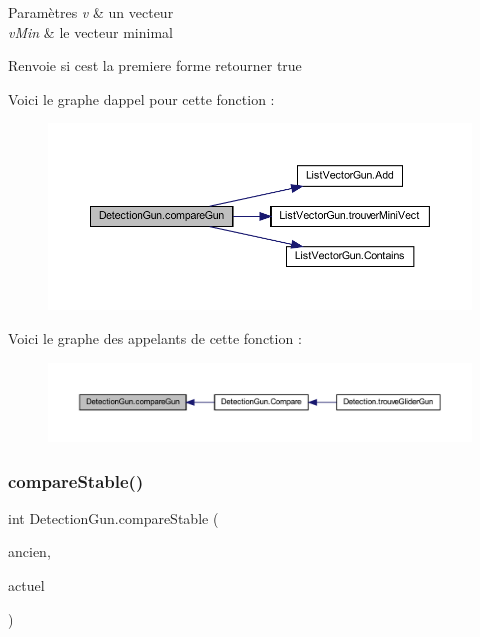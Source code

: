 \begin{DoxyParams}{Paramètres}
{\em v} & un vecteur \\
\hline
{\em v\+Min} & le vecteur minimal \\
\hline
\end{DoxyParams}
\begin{DoxyReturn}{Renvoie}
si c\textquotesingle{}est la premiere forme retourner true 
\end{DoxyReturn}
Voici le graphe d\textquotesingle{}appel pour cette fonction \+:\nopagebreak
\begin{figure}[H]
\begin{center}
\leavevmode
\includegraphics[width=350pt]{class_detection_gun_a0ca849e6a37b8734261999c4f8f64523_cgraph}
\end{center}
\end{figure}
Voici le graphe des appelants de cette fonction \+:\nopagebreak
\begin{figure}[H]
\begin{center}
\leavevmode
\includegraphics[width=350pt]{class_detection_gun_a0ca849e6a37b8734261999c4f8f64523_icgraph}
\end{center}
\end{figure}
\mbox{\label{class_detection_gun_af0283c67f8fe041c2ff8ded541054d56}} 
\subsubsection{\texorpdfstring{compare\+Stable()}{compareStable()}}
{\footnotesize\ttfamily int Detection\+Gun.\+compare\+Stable (\begin{DoxyParamCaption}\item[{List$<$ \mbox{\hyperlink{class_list_vector_gun}{List\+Vector\+Gun}} $>$}]{ancien,  }\item[{List$<$ \mbox{\hyperlink{class_list_vector_gun}{List\+Vector\+Gun}} $>$}]{actuel }\end{DoxyParamCaption})\hspace{0.3cm}{\ttfamily [inline]}}



